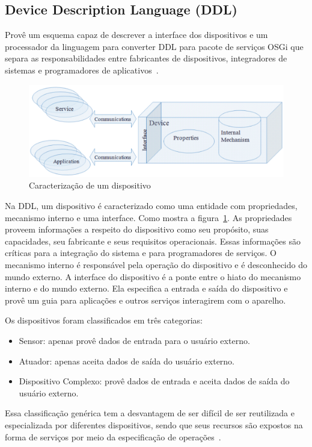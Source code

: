 \subsection{Device Description Language (DDL)}
\label{subsec:ddl}

Provê um esquema capaz de descrever a interface dos dispositivos e um processador da linguagem para converter DDL para pacote de serviços OSGi que separa as responsabilidades entre fabricantes de dispositivos, integradores de sistemas e programadores de aplicativos~\cite{gatorTechDDL}.

\begin{figure}[ht]
\center
\includegraphics[scale=0.4]{imagens/gatorDDL}
\caption{Caracterização de um dispositivo~\cite{ddlSpec}}
\label{fig:ddlspec}
\end{figure}

Na DDL, um dispositivo é caracterizado como uma entidade com propriedades, mecanismo interno e uma interface. Como mostra a figura~\ref{fig:ddlspec}. As propriedades proveem informações a respeito do dispositivo como seu propósito, suas capacidades, seu fabricante e seus requisitos operacionais. Essas informações são críticas para a integração do sistema e para programadores de serviços. O mecanismo interno é responsável pela operação do dispositivo e é desconhecido do mundo externo. A interface do dispositivo é a ponte entre o hiato do mecanismo interno e do mundo externo. Ela especifica a entrada e saída do dispositivo e provê um guia para aplicações e outros serviços interagirem com o aparelho.

Os dispositivos foram classificados em três categorias:
\begin{itemize}
	\item Sensor: apenas provê dados de entrada para o usuário externo.
	\item Atuador: apenas aceita dados de saída do usuário externo.
	\item Dispositivo Complexo: provê dados de entrada e aceita dados de saída do usuário externo.
\end{itemize}

Essa classificação genérica tem a desvantagem de ser difícil de ser reutilizada e especializada por diferentes dispositivos, sendo que seus recursos são expostos na forma de serviços por meio da especificação de operações~\cite{ddlSpec}.
